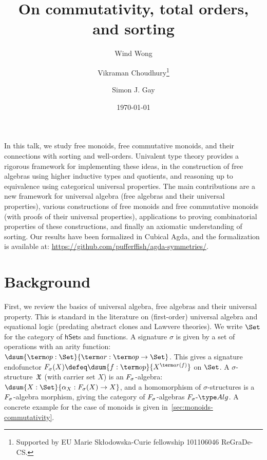 \documentclass{article}
\title{On commutativity, total orders, and sorting}
\author[1]{Wind Wong}
\author[2]{Vikraman Choudhury\footnote{Supported by EU Marie Skłodowska-Curie fellowship 101106046 ReGraDe-CS.}}
\author[3]{Simon J. Gay}
\affil[1,3]{University of Glasgow}
\affil[2]{Universit\`{a} di Bologna and OLAS Team, INRIA}
\date{\today}
\begin{document}
\maketitle
\noindent
In this talk, we study free monoids, free commutative monoids, and their connections with sorting and well-orders.
%
Univalent type theory provides a rigorous framework for implementing these ideas,
in the construction of free algebras using higher inductive types and quotients,
and reasoning up to equivalence using categorical universal properties.
%
The main contributions are a new framework for universal algebra (free algebras and their universal properties),
various constructions of free monoids and free commutative monoids (with proofs of their universal properties),
applications to proving combinatorial properties of these constructions,
and finally an axiomatic understanding of sorting.
%
Our results have been formalized in Cubical Agda, and the formalization is available at:
\url{https://github.com/pufferffish/agda-symmetries/}.

\section{Background}
\label{sec:background}

First, we review the basics of universal algebra, free algebras and their universal property.
%
This is standard in the literature on (first-order) universal algebra and equational logic (predating abstract clones
and Lawvere theories).
%
We write $\Set$ for the category of $\mathsf{hSet}$s and functions.
%
A signature $\sigma$ is given by a set of operations with an arity function:
$\dsum{\op:\Set}{\ar:\op \to \Set}$.
%
This gives a signature endofunctor $\Sig(X) \defeq \dsum{f:\op}{X^{\ar(f)}}$ on $\Set$.
%
A $\sigma$-structure~$\mathfrak{X}$ (with carrier set $X$) is an $\Sig$-algebra: $\dsum{X:\Set}{\alpha_X:\Sig(X) \to X}$,
and a homomorphism of $\sigma$-structures is a $\Sig$-algebra morphism,
giving the category of $\Sig$-algebras $\SigAlg$.
A concrete example for the case of monoids is given in~\cref{sec:monoids-commutativity}.
\end{document}
